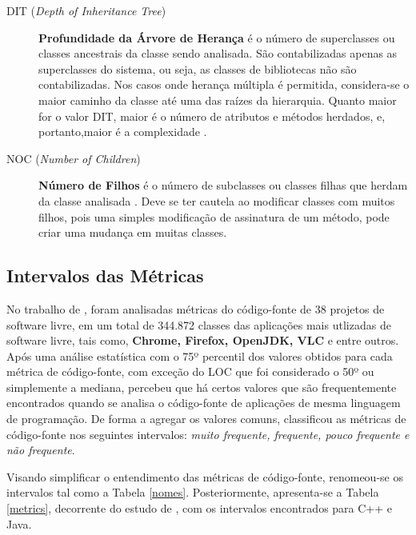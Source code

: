 \begin{description}
	\item [DIT (\textit{Depth of Inheritance Tree})] \textbf{Profundidade da 
	Árvore de Herança} é o número de superclasses ou classes ancestrais da 
	classe sendo analisada. São contabilizadas apenas as superclasses do 
	sistema, ou seja, as classes de bibliotecas não são contabilizadas. 
	Nos casos onde herança múltipla é permitida, considera-se o maior 
	caminho da classe até uma das raízes da hierarquia. Quanto maior for o 
	valor DIT, maior é o número de atributos e métodos herdados, e, portanto,maior é a complexidade \cite{Shih97}.
	
	\item[NOC (\textit{Number of Children})] \textbf{Número de Filhos} é o 
	número de subclasses ou classes filhas que herdam da classe analisada 
	\cite{Rosenberg97}. Deve se ter cautela ao modificar classes com muitos 
	filhos, pois uma simples modificação de assinatura de um método, pode criar
	uma mudança em muitas classes.
	

\end{description}
	
\subsection{Intervalos das Métricas}
\label{Intervalos das Métricas}

No trabalho de , foram analisadas métricas do código-fonte de 38 projetos de software livre, em um total de 344.872 classes das aplicações mais utlizadas de software livre, tais como, \textbf{Chrome, Firefox, OpenJDK, VLC} e entre outros. Após uma análise estatística com o 75º percentil dos valores obtidos para cada métrica de código-fonte, com exceção do LOC que foi considerado o 50º ou simplemente a mediana,  percebeu que há certos valores que são frequentemente encontrados quando se analisa o código-fonte de aplicações de mesma linguagem de programação. De forma a agregar os valores comuns,  classificou as métricas de código-fonte nos seguintes intervalos: \textit{muito frequente, frequente, pouco frequente e não frequente}. 

Visando simplificar o entendimento das métricas de código-fonte, renomeou-se os intervalos tal como a Tabela \ref{nomes}. Posteriormente, apresenta-se a Tabela \ref{metrics}, 
decorrente do estudo de , com os intervalos 
encontrados para C++ e Java.

